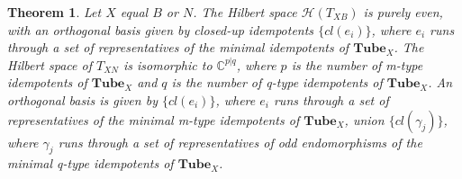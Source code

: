 \documentclass[12pt,a4paper]{article}
\newtheorem{theorem}{Theorem}
\newcommand{\cc}{\mathbb{C}}
\newcommand{\mch}{\mathcal{H}}
\newcommand{\tube}{\textbf{Tube}}
\begin{document}
\begin{theorem} \label{torus_basis_theorem}
Let $X$ equal $B$ or $N$.
The Hilbert space $\mch(T_{XB})$ is purely even, with an orthogonal basis given by closed-up idempotents $\{cl(e_i)\}$,
where $e_i$ runs through a set of representatives of the minimal idempotents of $\tube_X$.
The Hilbert space of $T_{XN}$ is isomorphic to $\cc^{p|q}$, where $p$ is the number of m-type idempotents of $\tube_X$
and $q$ is the number of q-type idempotents of $\tube_X$.
An orthogonal basis is given by $\{cl(e_i)\}$, where $e_i$ runs through a set of 
representatives of the minimal m-type idempotents of $\tube_X$,
union $\{cl(\gamma_j)\}$,
where $\gamma_j$ runs through a set of representatives of odd endomorphisms of the minimal q-type idempotents of $\tube_X$.
\end{theorem}
\end{document}
